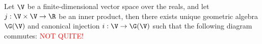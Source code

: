 \begin{definition}
	Let $\V$ be a finite-dimensional vector space over the reals, and let $j: \V \times \V \to \R$ be an inner product, then there exists unique geometric algebra $\G(\V)$ and canonical injection $i: \V \to \G(\V)$ such that the following diagram commutes:
	\textcolor{red}{NOT QUITE!}
\end{definition}
